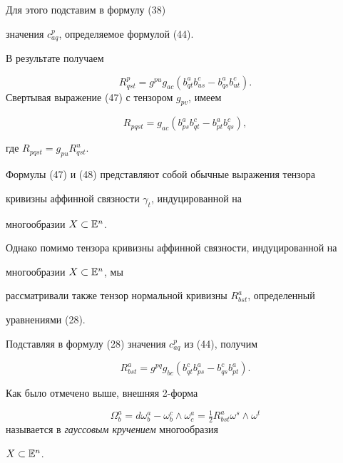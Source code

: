  Для этого подставим в формулу (38)


значения $c_{aq}^p$, определяемое формулой (44).


В результате получаем


\begin{equation}\label{eq:67}
R^p_{qst} = g^{pu} g_{ac} (b^a_{qt} b^c_{us} - b^a_{qs} b_{ut}^c).
\end{equation}
Свертывая выражение (47) с тензором $g_{pv}$, имеем


\begin{equation}\label{eq:68}
R_{pqst} = g_{ac} (b^a_{ps} b^c_{qt} - b^a_{pt} b_{qs}^c),
\end{equation}


где $R_{pqst} = g_{pu} R^u_{qst}$.


Формулы (47) и (48) представляют собой обычные выражения тензора


кривизны аффинной связности $\gamma_t$, индуцированной на


многообразии $X \subset \Bbb{E}^n$.





Однако помимо тензора кривизны аффинной связности, индуцированной на


многообразии $X \subset \Bbb{E}^n$, мы


рассматривали также тензор нормальной кривизны $R^a_{bst}$, определенный


уравнениями (28).


Подставляя в формулу (28) значения $c_{aq}^p$ из (44), получим


\begin{equation*}


R^a_{bst} = g^{pq} g_{bc} (b^c_{qt} b_{ps}^a - b^c_{qs}
b_{pt}^a).
\end{equation*}





Как было отмечено выше, внешняя 2-форма


$$


\Omega_b^a = d \omega_b^a - \omega_b^c \wedge \omega_c^a =
\tfrac{1}{2}R^a_{bst} \omega^s \wedge \omega^t


$$
называется  в \cite{Ca01} {\it гауссовым кручением} многообразия


$X \subset \Bbb{E}^n$.




